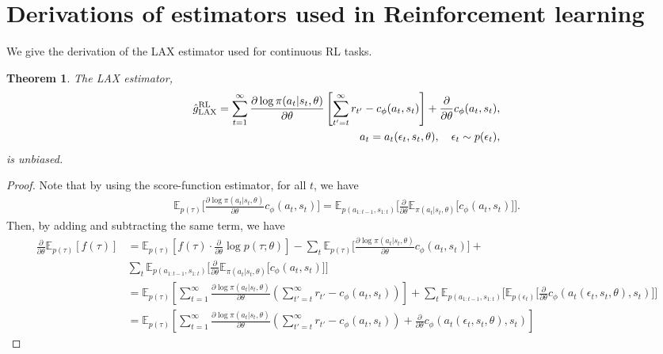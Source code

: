 \documentclass{article}
\newcommand{\E}{\mathbb{E}}
\newcommand{\LL}[1]{\frac{\partial \log \pi(a_{#1}| s_{#1}, \theta)}{\partial \theta}}
\newcommand{\PT}{\frac{\partial}{\partial \theta}}
\newcommand{\LP}[1]{\PT \log p(#1)}
\newcommand{\LAX}{{\textnormal{LAX}}}
\newcommand{\RL}{{\textnormal{RL}}}
\newtheorem{theorem}{Theorem}[section]
\begin{document}


\section{Derivations of estimators used in Reinforcement learning}
\label{rl appendix}
We give the derivation of the \LAX{} estimator used for continuous RL tasks.
\begin{theorem}
The \LAX{} estimator,
\begin{align}
\hat g_\LAX^{\RL} = \sum_{t=1}^{\infty} \LL{t} \left[ \sum_{t'=t}^{\infty} r_{t'} - c_\phi(a_t,s_t) \right] +\frac{\partial}{\partial\theta} c_\phi(a_t, s_t), \\
a_t = a_t(\epsilon_t,s_t,\theta), \quad \epsilon_t \sim p(\epsilon_t)\nonumber,
\end{align}
is unbiased.
\end{theorem}
\begin{proof}
Note that by using the score-function estimator, for all $t$, we have 
%
\begin{align*}
\E_{p(\tau)}\Big[\LL{t} c_\phi(a_t, s_t)\Big] = \E_{p(a_{1:t-1},s_{1:t})}\Big[\frac{\partial}{\partial\theta}\E_{\pi(a_t|s_t, \theta)}\Big[c_\phi(a_t, s_t)\Big]\Big].
\end{align*}
Then, by adding and subtracting the same term, we have
\begin{align*}
\PT\E_{p(\tau)}[f(\tau)] &= \E_{p(\tau)}\left[f(\tau)\cdot\LP{\tau;\theta}\right]-\sum_t\E_{p(\tau)}\Big[\LL{t} c_\phi(a_t, s_t)\Big]+\\&\sum_t \E_{p(a_{1:t-1},s_{1:t})}\Big[\frac{\partial}{\partial\theta}\E_{\pi(a_t|s_t, \theta)}\Big[c_\phi(a_t,s_t)\Big]\Big]\nonumber\\
&= \E_{p(\tau)}\left[ \sum_{t=1}^{\infty} \LL{t}\left(\sum_{t'=t}^{\infty} r_{t'} - c_\phi(a_t,s_t)\right)\right]+\sum_t \E_{p(a_{1:t-1},s_{1:t})}\Big[\E_{p(\epsilon_t)}\Big[\frac{\partial}{\partial\theta}c_\phi(a_t(\epsilon_t,s_t,\theta), s_t)\Big]\Big]\nonumber\\
&= \E_{p(\tau)}\left[ \sum_{t=1}^{\infty} \LL{t}\left(\sum_{t'=t}^{\infty} r_{t'} - c_\phi(a_t,s_t)\right)+\frac{\partial}{\partial\theta}c_\phi(a_t(\epsilon_t,s_t,\theta), s_t)\right]\nonumber
\end{align*}
\end{proof}
\end{document}
